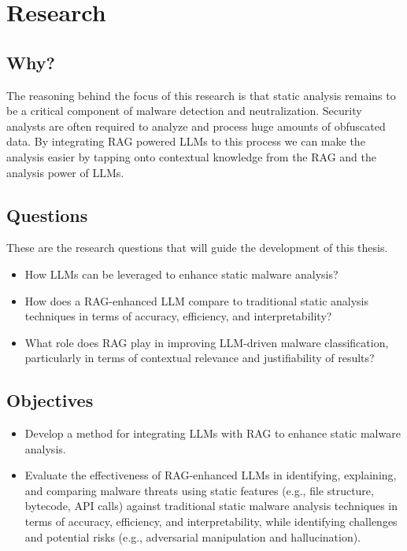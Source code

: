 \section{Research}

\subsection{Why?}
The reasoning behind the focus of this research is that static analysis remains to be a critical
component of malware detection and neutralization. Security analysts are often required to analyze
and process huge amounts of obfuscated data. By integrating RAG powered LLMs to this process we can
make the analysis easier by tapping onto contextual knowledge from the RAG and the analysis power
of LLMs. 

\subsection{Questions}
These are the research questions that will guide the development of this thesis.
\begin{itemize}
	\item How LLMs can be leveraged to enhance static malware analysis?
	\item How does a RAG-enhanced LLM compare to traditional static analysis techniques in terms of accuracy,
	      efficiency, and interpretability?
	\item What role does RAG play in improving LLM-driven malware classification, particularly in terms of
	      contextual relevance and justifiability of results?
\end{itemize}

\subsection{Objectives}
\begin{itemize}
	\item Develop a method for integrating LLMs with RAG to enhance static malware analysis.
	\item Evaluate the effectiveness of RAG-enhanced LLMs in identifying, explaining, and comparing malware
	      threats using static features (e.g., file structure, bytecode, API calls) against traditional
	      static malware analysis techniques in terms of accuracy, efficiency, and interpretability, while
	      identifying challenges and potential risks (e.g., adversarial manipulation and hallucination).
\end{itemize}

